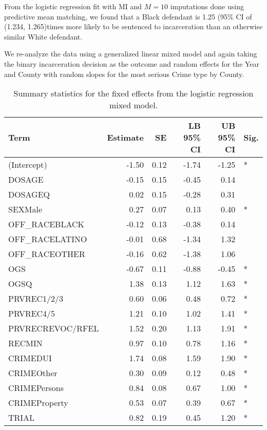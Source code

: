 \documentclass[
  letterpaper,
  DIV=11,
  numbers=noendperiod]{scrartcl}
\begin{document}
From the logistic regression fit with MI and \(M = 10\) imputations done
using predictive mean matching, we found that a Black defendant is 1.25
(95\% CI of (1.234, 1.265)times more likely to be sentenced to
incarceration than an otherwise similar White defendant.

We re-analyze the data using a generalized linear mixed model and again
taking the binary incarceration decision as the outcome and random
effects for the Year and County with random slopes for the most serious
Crime type by County.

\hypertarget{tbl-glmm-sum}{}
\begin{table}
\caption{\label{tbl-glmm-sum}Summary statistics for the fixed effects from the logistic regression
mixed model. }\tabularnewline

\centering
\begin{tabular}{l|r|r|r|r|l}
\hline
Term & Estimate & SE & LB 95\% CI & UB 95\% CI & Sig.\\
\hline
(Intercept) & -1.50 & 0.12 & -1.74 & -1.25 & *\\
\hline
DOSAGE & -0.15 & 0.15 & -0.45 & 0.14 & \\
\hline
DOSAGEQ & 0.02 & 0.15 & -0.28 & 0.31 & \\
\hline
SEXMale & 0.27 & 0.07 & 0.13 & 0.40 & *\\
\hline
OFF\_RACEBLACK & -0.12 & 0.13 & -0.38 & 0.14 & \\
\hline
OFF\_RACELATINO & -0.01 & 0.68 & -1.34 & 1.32 & \\
\hline
OFF\_RACEOTHER & -0.16 & 0.62 & -1.38 & 1.06 & \\
\hline
OGS & -0.67 & 0.11 & -0.88 & -0.45 & *\\
\hline
OGSQ & 1.38 & 0.13 & 1.12 & 1.63 & *\\
\hline
PRVREC1/2/3 & 0.60 & 0.06 & 0.48 & 0.72 & *\\
\hline
PRVREC4/5 & 1.21 & 0.10 & 1.02 & 1.41 & *\\
\hline
PRVRECREVOC/RFEL & 1.52 & 0.20 & 1.13 & 1.91 & *\\
\hline
RECMIN & 0.97 & 0.10 & 0.78 & 1.16 & *\\
\hline
CRIMEDUI & 1.74 & 0.08 & 1.59 & 1.90 & *\\
\hline
CRIMEOther & 0.30 & 0.09 & 0.12 & 0.48 & *\\
\hline
CRIMEPersons & 0.84 & 0.08 & 0.67 & 1.00 & *\\
\hline
CRIMEProperty & 0.53 & 0.07 & 0.39 & 0.67 & *\\
\hline
TRIAL & 0.82 & 0.19 & 0.45 & 1.20 & *\\

\end{tabular}
\end{table}
\end{document}
